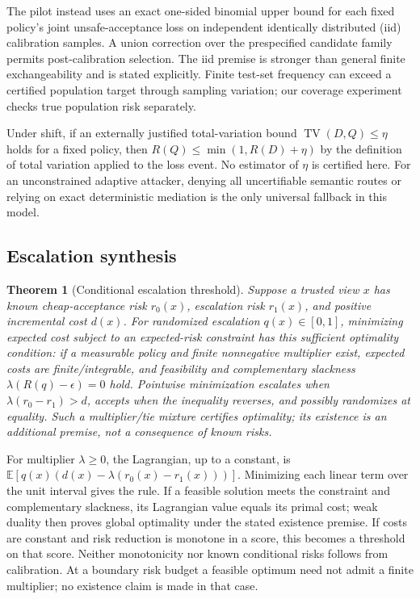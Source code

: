 \documentclass[lettersize,journal]{IEEEtran}
\newtheorem{theorem}{Theorem}
\begin{document}
The pilot instead uses an exact one-sided binomial upper bound for each fixed
policy's joint unsafe-acceptance loss on independent identically distributed
(iid) calibration samples. A union correction over the prespecified candidate
family permits post-calibration selection. The iid premise is stronger than
general finite exchangeability and is stated explicitly. Finite test-set
frequency can exceed a certified population target through sampling variation;
our coverage experiment checks true population risk separately.

Under shift, if an externally justified total-variation bound
$\operatorname{TV}(D,Q)\leq\eta$ holds for a fixed policy, then
$R(Q)\leq\min(1,R(D)+\eta)$ by the definition of total variation applied to
the loss event. No estimator of $\eta$ is certified here. For an unconstrained
adaptive attacker, denying all uncertifiable semantic routes or relying on
exact deterministic mediation is the only universal fallback in this model.

\subsection{Escalation synthesis}
\begin{theorem}[Conditional escalation threshold]
\label{thm:optimization}
Suppose a trusted view $x$ has known cheap-acceptance risk $r_0(x)$,
escalation risk $r_1(x)$, and positive incremental cost $d(x)$. For randomized
escalation $q(x)\in[0,1]$, minimizing expected cost subject to an expected-risk
constraint has this sufficient optimality condition: if a measurable policy
and finite nonnegative multiplier exist, expected costs are finite/integrable,
and feasibility and complementary slackness $\lambda(R(q)-\epsilon)=0$ hold.
Pointwise minimization escalates when
$\lambda(r_0-r_1)>d$, accepts when the inequality reverses, and possibly
randomizes at equality. Such a multiplier/tie mixture certifies optimality;
its existence is an additional premise, not a consequence of known risks.
\end{theorem}
\begin{IEEEproof}
For multiplier $\lambda\geq0$, the Lagrangian, up to a constant, is
$\mathbb{E}[q(x)(d(x)-\lambda(r_0(x)-r_1(x)))]$.
Minimizing each linear term over the unit interval gives the rule. If a
feasible solution meets the constraint and complementary slackness, its
Lagrangian value equals its primal cost; weak duality then proves global
optimality under the stated existence premise. If costs are constant and
risk reduction is monotone in a score, this becomes a threshold on that score.
Neither monotonicity nor known conditional risks follows from calibration.
At a boundary risk budget a feasible optimum need not admit a finite
multiplier; no existence claim is made in that case.
\end{IEEEproof}
\end{document}
